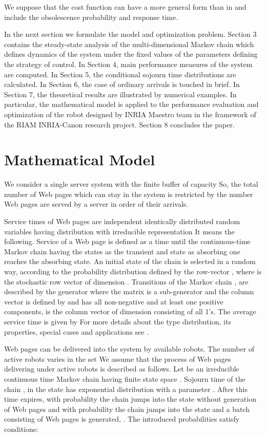 \documentclass[11pt]{article}
\begin{document}
We suppose that the cost function can have a more general form 
than in \cite{tlnc} and include the obsolescence probability and 
response time.

In the next section we formulate the model and optimization problem.
Section 3 contains the steady-state analysis of the
multi-dimensional Markov chain which defines dynamics of the system
under the fixed values of the parameters defining the strategy of
control. In Section 4, main performance measures of the system are
computed. In Section 5, the conditional sojourn time distributions
are calculated. In Section 6, the case of ordinary arrivals is touched in brief.
In Section 7, the theoretical results are illustrated by numerical examples.
In particular, the mathematical model is applied to the performance evaluation
and optimization of the robot designed by INRIA Maestro team in the
framework of the RIAM INRIA-Canon research project.
Section 8 concludes the paper.



\section{Mathematical Model}

We consider a single server system with the finite buffer of
capacity  So, the total number of Web pages which
can stay in the system is restricted by the number  Web pages
are served by a server in order of their arrivals.

Service times of Web pages are independent identically distributed
random variables having  distribution with irreducible
representation  It means the following.
Service of a Web page is defined as a time until the continuous-time
Markov chain  having the states  as
the transient and state  as absorbing one reaches the absorbing
state. An initial state of the chain is selected in a random way,
according to the probability distribution defined by the row-vector
, where  is the
stochastic row vector of dimension . Transitions of the Markov
chain , are described by the generator 
where the matrix  is a sub-generator and the column
vector  is defined by  and has all
non-negative and at least one positive components,  is
the column vector of dimension  consisting of all 1's.
 The average service time  is given by 
For more details about the  type distribution, its properties,
special cases and applications see \cite{n81,pp}. 

Web pages can be delivered into the system by  available robots.
The number of active robots varies in the set  We
assume that the process of Web pages delivering under  active robots is described as follows. Let
 be an irreducible continuous time Markov chain
having finite state space . Sojourn time of the
chain , in the state  has exponential
distribution with a parameter . After this time
expires, with probability  the chain jumps into
the state  without generation of Web pages and with
probability  the chain jumps into the state
 and a batch consisting of  Web pages  is generated, .  The introduced probabilities satisfy conditions:
\end{document}
